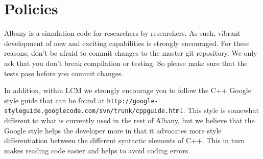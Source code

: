 \documentclass[10pt,a4paper]{article} \usepackage[utf8]{inputenc}
\begin{document}
\section{Policies}
Albany is a simulation code for researchers by researchers. As such,
vibrant development of new and exciting capabilities is strongly
encouraged. For these reasons, don't be afraid to commit changes to
the master git repository. We only ask that you don't break
compilation or testing. So please make sure that the tests pass before
you commit changes.

In addition, within LCM we strongly encourage you to follow the C++
Google style guide that can be found at
\verb+http://google-styleguide.googlecode.com/svn/trunk/cppguide.html+.
This style is somewhat different to what is currently used in the rest
of Albany, but we believe that the Google style helps the developer
more in that it advocates more style differentiation between the
different syntactic elements of C++. This in turn makes reading code
easier and helps to avoid coding errors.
\end{document}
